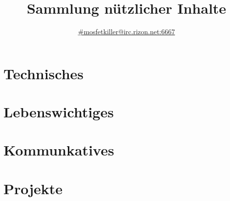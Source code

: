 \documentclass[oneside,12pt,a4paper]{scrartcl}
\title{Sammlung nützlicher Inhalte}
\author{\href{http://chat.mibbit.com/?channel=\%23mosfetkiller\&nick=your_nick_here\&server=irc.rizon.net\&autoConnect=true}{\#mosfetkiller@irc.rizon.net:6667}}
\begin{document}
\maketitle

\tableofcontents
\clearpage

\part{Technisches}


\part{Lebenswichtiges}


\part{Kommunkatives}


\part{Projekte}

\end{document}
